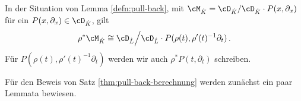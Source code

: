 %
\begin{thm} \label{thm:pull-back-berechnung}
In der Situation von Lemma \ref{defn:pull-back}, mit
$\cM_{\hat K}=\cD_{\hat K}/\cD_{\hat K}\cdot P(x,\partial_x)$ für ein
$P(x,\partial_x)\in\cD_{\hat K}$, gilt
\[\rho^*\cM_{\hat K}\cong \cD_{\hat L}\Big/\cD_{\hat L}\cdot
  P(\rho(t),\rho'(t)^{-1}\partial_t) \,. \]
Für $P(\rho(t),\rho'(t)^{-1}\partial_t)$ werden wir auch
$\rho^*P(t,\partial_t)$ schreiben.
\end{thm}
\begin{comment}
\cite[Seite 130]{coutinho1995primer} Holonomic modules are preserved under
this construction.
\end{comment}
%
\begin{comment}
\cite[Page 34]{sabbah_cimpa90}
Sei $\cM_{\hat K}$ ein formaler meromorpher Zusammenhang. Man definiert
$\pi^*\cM_{\hat K}$ als den Vektor Raum über $\hat L:\pi^*\cM_{\hat K}=\hat
L\otimes_{\hat K}\cM_{\hat K}$. Dann definiert man die Wirkung von $\partial_t$
durch: $t\partial_t\cdot(1\otimes m)=q(1\otimes(x\partial_x\otimes m))$ und
damit
\[
t\partial_t\cdot(\phi\otimes m)=q(\phi\otimes(x\partial_x\cdot
m))+((t\frac{\partial\phi}{\partial t})\otimes m) \,.
\]
Man erhält damit die Wirkung von $\partial_t=t^{-1}(t\partial_t)$.
\end{comment}

Für den Beweis von Satz \ref{thm:pull-back-berechnung} werden zunächst ein paar Lemmata bewiesen.

